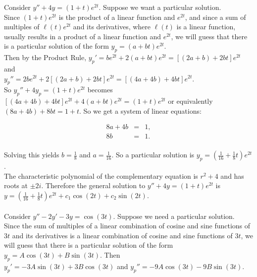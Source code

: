 \documentclass{ximera}
\begin{document}
\newpage

Consider $y''+4y=(1+t)e^{2t}$.  Suppose we want a particular solution.\\


 Since $(1+t)e^{2t}$ is the product of a linear function and $e^{2t}$, and since a sum of multiples of $\ell(t)e^{2t}$ and its derivatives, where $\ell(t)$ is a linear function, usually results in a product of a linear function and $e^{2t}$,  we will guess that there is a particular solution of the form $y_p=(a+bt)e^{2t}$.\\

 Then by the Product Rule, $y_p'=be^{2t}+2(a+bt)e^{2t}=[(2a+b)+2bt]e^{2t}$ and\\ $y_p''=2be^{2t}+2[(2a+b)+2bt]e^{2t}=[(4a+4b)+4bt]e^{2t}$. \\

 So $y_p''+4y_p=(1+t)e^{2t}$ becomes $[(4a+4b)+4bt]e^{2t}+4(a+bt)e^{2t}=(1+t)e^{2t}$ or equivalently\\ $(8a+4b)+8bt=1+t$.  So we get a system of linear equations:

 \begin{eqnarray*}
  8a+4b &=& 1, \\
  8b &=& 1.\\
 \end{eqnarray*}

 Solving this yields $b=\frac{1}{8}$ and $a=\frac{1}{16}$.  So a particular solution is $y_p=\left(\frac{1}{16}+\frac{1}{8}t\right)e^{2t}$.\\

 The characteristic polynomial of the complementary equation is $r^2+4$ and has roots at $\pm 2i$.  Therefore the general solution to $y''+4y=(1+t)e^{2t}$ is $y=\left(\frac{1}{16}+\frac{1}{8}t\right)e^{2t}+c_1 \cos(2t)+c_2 \sin{(2t)}$.\\ \\


 Consider $y''-2y'-3y=\cos{(3t)}$.  Suppose we need a particular solution.\\


 Since the sum of multiples of a linear combination of cosine and sine functions of $3t$ and its derivatives is a linear combination of cosine and sine functions of $3t$, we will guess that there is a particular solution of the form $y_p=A\cos{(3t)}+B\sin{(3t)}$.  Then\\ $y_p'=-3A\sin{(3t)}+3B\cos{(3t)}$ and $y_p''=-9A\cos{(3t)}-9B\sin{(3t)}$.\\
\end{document}

